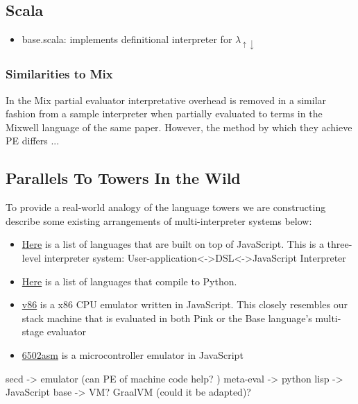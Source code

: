 \documentclass[fleqn]{article}
\theoremstyle{definition}
\newcommand{\mslang}{$\lambda_{\uparrow\downarrow}$}
\begin{document}
\subsection{Scala}
\begin{itemize}
	\item base.scala: implements definitional interpreter for \mslang
\end{itemize}

\subsubsection{Similarities to Mix}
In the Mix partial evaluator \cite{jones1989mix} interpretative overhead is removed in a similar fashion from a sample interpreter when partially evaluated to terms in the Mixwell language of the same paper. However, the method by which they achieve PE differs ...

\subsection{Parallels To Towers In the Wild}
To provide a real-world analogy of the language towers we are constructing describe some existing arrangements of multi-interpreter systems below:
\begin{itemize}
	\item \href{https://github.com/jashkenas/coffeescript/wiki/List-of-languages-that-compile-to-JS}{Here} is a list of languages that are built on top of JavaScript. This is a three-level interpreter system: User-application<->DSL<->JavaScript Interpreter
	\item \href{https://github.com/vindarel/languages-that-compile-to-python#other-languages-that-target-the-python-platform}{Here} is a list of languages that compile to Python.
	\item \href{https://github.com/copy/v86}{v86} is a x86 CPU emulator written in JavaScript. This closely resembles our stack machine that is evaluated in both Pink or the Base language's multi-stage evaluator
	\item \href{http://6502asm.com/}{6502asm} is a microcontroller emulator in JavaScript
\end{itemize}
secd -> emulator (can PE of machine code help? \cite{srinivasan2015partial})
meta-eval -> python
lisp -> JavaScript
base -> VM? GraalVM (could it be adapted)?
\end{document}
